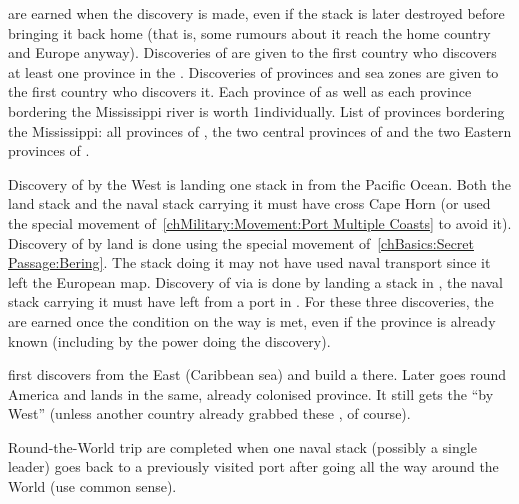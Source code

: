\aparag[Discoveries] \VPs are earned when the discovery is made, even if the
stack is later destroyed before bringing it back home (that is, some rumours
about it reach the home country and Europe anyway).
\bparag Discoveries \VPs of \Areas are given to the first country who
discovers at least one province in the \Area.
\bparag Discoveries \VPs of provinces and sea zones are given to the first
country who discovers it. Each province of \granderegionAmazonia as well as
each province bordering the Mississippi river is worth 1\VP individually.
\bparag List of provinces bordering the Mississippi: all provinces of
\granderegionMississippi, the two central provinces of \granderegionIllinois
and the two Eastern provinces of \granderegionKansas.

\bparag Discovery of \granderegionPanama by the West is landing one stack in
\granderegionPanama from the Pacific Ocean. Both the land stack and the naval
stack carrying it must have cross Cape Horn (or used the special movement
of~\ref{chMilitary:Movement:Port Multiple Coasts} to avoid it).
\bparag Discovery of \granderegionKamchatka by land is done using the special
movement of~\ref{chBasics:Secret Passage:Bering}. The stack doing it may not
have used naval transport since it left the European map.
\bparag Discovery of \granderegionAlaska via \continentAsia is done by landing
a stack in \granderegionAlaska, the naval stack carrying it must have left
from a port in \continentAsia.
\bparag For these three discoveries, the \VPs are earned once the condition on
the way is met, even if the province is already known (including by the power
doing the discovery). 

\begin{exemple}
  \HIS first discovers \granderegionPanama from the East (Caribbean sea) and
  build a \COL there. Later \HIS goes round America and lands in the same,
  already colonised province. It still gets the ``\granderegionPanama by
  West'' \VPs (unless another country already grabbed these \VPs, of course).
\end{exemple}


\aparag[Circumnavigation] Round-the-World trip are completed when one naval
stack (possibly a single leader) goes back to a previously visited port after
going all the way around the World (use common sense).


